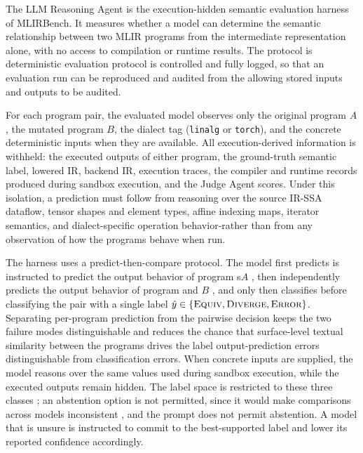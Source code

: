 \documentclass[sigplan,screen,review,anonymous]{acmart}
\providecommand{\DIFadd}[1]{{\protect\color{blue} \sf #1}} %
\providecommand{\DIFdel}[1]{{\protect\color{red} \scriptsize #1}} %
\providecommand{\DIFaddbegin}{} %
\providecommand{\DIFaddend}{} %
\providecommand{\DIFdelbegin}{} %
\providecommand{\DIFdelend}{} %
\begin{document}
The LLM Reasoning Agent is the execution-hidden semantic evaluation harness of MLIRBench. It measures whether a model can determine the semantic relationship between two MLIR programs from the intermediate representation alone, with no access to compilation or runtime results. The \DIFdelbegin \DIFdel{protocol is deterministic }\DIFdelend \DIFaddbegin \DIFadd{evaluation protocol is controlled }\DIFaddend and fully logged,
\DIFdelbegin \DIFdel{so that an evaluation run can be reproduced and audited from the }\DIFdelend \DIFaddbegin \DIFadd{allowing }\DIFaddend stored inputs and outputs \DIFaddbegin \DIFadd{to be audited}\DIFaddend .

For each program pair, the evaluated model observes only the original program $A$, the mutated program $B$, the dialect tag (\texttt{linalg} or \texttt{torch}), and the concrete deterministic inputs when they are available. All execution-derived information is withheld: the executed outputs of either program, the ground-truth semantic label, lowered IR, backend IR, execution traces, the compiler and runtime records produced during sandbox execution, and the Judge Agent scores. Under this isolation, a prediction must follow from reasoning over the source IR-SSA dataflow, tensor shapes and element types, affine indexing maps, iterator semantics, and dialect-specific operation behavior-rather than from any observation of how the programs behave when run.

The harness uses a predict-then-compare protocol. The model \DIFdelbegin \DIFdel{first predicts }\DIFdelend \DIFaddbegin \DIFadd{is instructed to predict }\DIFaddend the output behavior of program\DIFaddbegin \DIFadd{s}\DIFaddend  $A$ \DIFdelbegin \DIFdel{, then independently predicts the output behavior of program }\DIFdelend \DIFaddbegin \DIFadd{and }\DIFaddend $B$ \DIFdelbegin \DIFdel{, and only then classifies }\DIFdelend \DIFaddbegin \DIFadd{before classifying }\DIFaddend the pair with a single label $\hat{y} \in \{\textsc{Equiv}, \textsc{Diverge}, \textsc{Error}\}$. Separating per-program prediction from the pairwise decision keeps \DIFdelbegin \DIFdel{the two failure modes distinguishable and reduces the chance that surface-level textual similarity between the programs drives the label}\DIFdelend \DIFaddbegin \DIFadd{output-prediction errors distinguishable from classification errors}\DIFaddend . When concrete inputs are supplied, the model reasons over the same values used during sandbox execution, while the executed outputs remain hidden. The label space is restricted to these three classes\DIFdelbegin \DIFdel{; an abstention option is not permitted, since it would make comparisons across models inconsistent}\DIFdelend \DIFaddbegin \DIFadd{, and the prompt does not permit abstention}\DIFaddend . A model that is unsure is instructed to commit to the best-supported label and lower its reported confidence accordingly.
\end{document}
